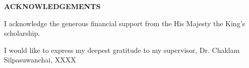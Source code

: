 {}
\begin{center}
    \large{\bf ACKNOWLEDGEMENTS}
\end{center}

I acknowledge the generous financial support from the His Majesty the King's scholarship.

I would like to express my deepest gratitude to my supervisor, Dr. Chaklam Silpasuwanchai, XXXX
